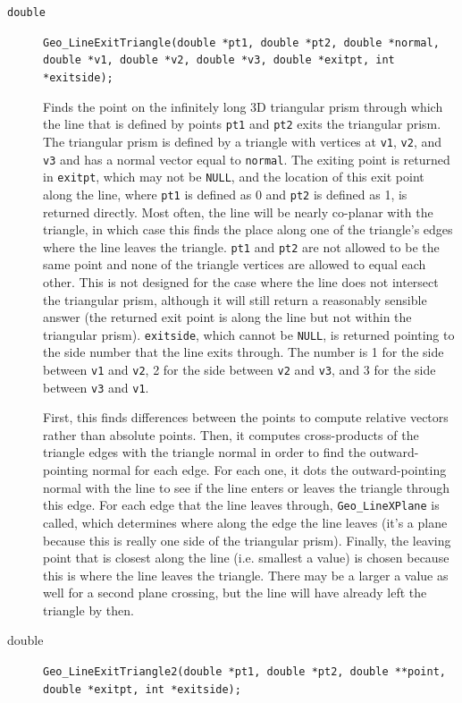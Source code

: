 \documentclass[11pt]{article}
\newcommand {\ttt} {\texttt}
\begin{document}
\begin{description}
\item[\ttt{double}]
\ttt{Geo\_LineExitTriangle(double *pt1, double *pt2, double *normal, double *v1, double *v2, double *v3, double *exitpt, int *exitside);}

Finds the point on the infinitely long 3D triangular prism through which the line that is defined by points \ttt{pt1} and \ttt{pt2} exits the triangular prism. The triangular prism is defined by a triangle with vertices at \ttt{v1}, \ttt{v2}, and \ttt{v3} and has a normal vector equal to \ttt{normal}. The exiting point is returned in \ttt{exitpt}, which may not be \ttt{NULL}, and the location of this exit point along the line, where \ttt{pt1} is defined as 0 and \ttt{pt2} is defined as 1, is returned directly. Most often, the line will be nearly co-planar with the triangle, in which case this finds the place along one of the triangle's edges where the line leaves the triangle. \ttt{pt1} and \ttt{pt2} are not allowed to be the same point and none of the triangle vertices are allowed to equal each other. This is not designed for the case where the line does not intersect the triangular prism, although it will still return a reasonably sensible answer (the returned exit point is along the line but not within the triangular prism). \ttt{exitside}, which cannot be \ttt{NULL}, is returned pointing to the side number that the line exits through. The number is 1 for the side between \ttt{v1} and \ttt{v2}, 2 for the side between \ttt{v2} and \ttt{v3}, and 3 for the side between \ttt{v3} and \ttt{v1}.

First, this finds differences between the points to compute relative vectors rather than absolute points. Then, it computes cross-products of the triangle edges with the triangle normal in order to find the outward-pointing normal for each edge. For each one, it dots the outward-pointing normal with the line to see if the line enters or leaves the triangle through this edge. For each edge that the line leaves through, \ttt{Geo\_LineXPlane} is called, which determines where along the edge the line leaves (it's a plane because this is really one side of the triangular prism). Finally, the leaving point that is closest along the line (i.e. smallest a value) is chosen because this is where the line leaves the triangle. There may be a larger a value as well for a second plane crossing, but the line will have already left the triangle by then.

\item[{double}]
\ttt{Geo\_LineExitTriangle2(double *pt1, double *pt2, double **point, double *exitpt, int *exitside);}


\end{description}
\end{document}
